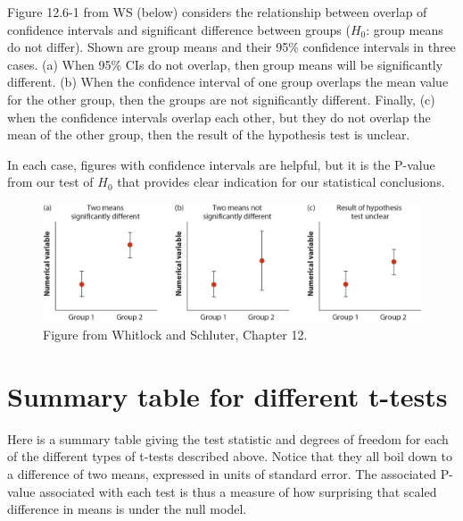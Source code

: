 \documentclass[]{book}
\theoremstyle{definition}
\theoremstyle{definition}
\theoremstyle{definition}
\theoremstyle{remark}
\begin{document}
Figure 12.6-1 from WS (below) considers the relationship between overlap
of confidence intervals and significant difference between groups
(\(H_0\): group means do not differ). Shown are group means and their
95\% confidence intervals in three cases. (a) When 95\% CIs do not
overlap, then group means will be significantly different. (b) When the
confidence interval of one group overlaps the mean value for the other
group, then the groups are not significantly different. Finally, (c)
when the confidence intervals overlap each other, but they do not
overlap the mean of the other group, then the result of the hypothesis
test is unclear.

In each case, figures with confidence intervals are helpful, but it is
the P-value from our test of \(H_0\) that provides clear indication for
our statistical conclusions.

\begin{figure}
\includegraphics[width=0.9\linewidth]{./figures/whitlock_12.6-1} \caption{Figure from Whitlock and Schluter, Chapter 12.}\label{fig:unnamed-chunk-450}
\end{figure}

\hypertarget{summary-table-for-different-t-tests}{%
\section{Summary table for different
t-tests}\label{summary-table-for-different-t-tests}}

Here is a summary table giving the test statistic and degrees of freedom
for each of the different types of t-tests described above. Notice that
they all boil down to a difference of two means, expressed in units of
standard error. The associated P-value associated with each test is thus
a measure of how surprising that scaled difference in means is under the
null model.
\end{document}
